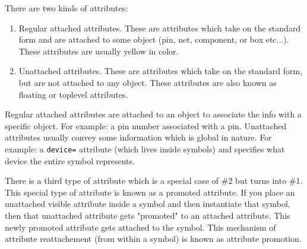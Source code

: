 \documentclass{article}
\begin{document}
There are two kinds of attributes:
\begin{enumerate}
\item Regular attached attributes.  These are attributes which take on
the standard form and are attached to some object (pin, net,
component, or box etc...).  These attributes are usually yellow in
color.
                
\item Unattached attributes.  These are attributes which take on the
standard form, but are not attached to any object.  These attributes
are also known as floating or toplevel attributes.
\end{enumerate}

Regular attached attributes are attached to an object to associate the
info with a specific object.  For example: a pin number associated
with a pin.  Unattached attributes usually convey some information
which is global in nature.  For example: a {\tt device=} attribute (which
lives inside symbols) and specifies what device the entire symbol
represents.

There is a third type of attribute which is a special case of \#2 but
turns into \#1.  This special type of attribute is known as a promoted
attribute.  If you place an unattached visible attribute inside a
symbol and then instantiate that symbol, then that unattached
attribute gets "promoted" to an attached attribute.  This newly
promoted attribute gets attached to the symbol.  This mechanism of
attribute reattachement (from within a symbol) is known as attribute
promotion.
\end{document}
